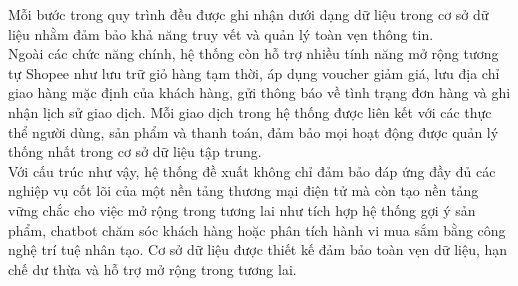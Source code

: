  Mỗi bước trong quy trình đều được ghi nhận dưới dạng dữ liệu trong cơ sở dữ liệu nhằm đảm bảo khả năng truy vết và 
 quản lý toàn vẹn thông tin. \\
 \hspace*{2em} Ngoài các chức năng chính, hệ thống còn hỗ trợ nhiều tính năng mở rộng tương tự Shopee như lưu trữ giỏ hàng tạm thời, 
 áp dụng voucher giảm giá, lưu địa chỉ giao hàng mặc định của khách hàng, gửi thông báo về tình trạng đơn hàng và 
 ghi nhận lịch sử giao dịch. Mỗi giao dịch trong hệ thống được liên kết với các thực thể người dùng, 
 sản phẩm và thanh toán, đảm bảo mọi hoạt động được quản lý thống nhất trong cơ sở dữ liệu tập trung.\\
\hspace*{2em}Với cấu trúc như vậy, hệ thống đề xuất không chỉ đảm bảo đáp ứng đầy đủ các nghiệp vụ cốt lõi của một nền tảng 
thương mại điện tử mà còn tạo nền tảng vững chắc cho việc mở rộng trong tương lai như 
tích hợp hệ thống gợi ý sản phẩm, chatbot chăm sóc khách hàng hoặc phân tích hành vi mua sắm bằng công nghệ trí tuệ nhân tạo. Cơ sở dữ liệu được thiết kế đảm bảo toàn vẹn dữ liệu, hạn chế dư thừa và hỗ trợ mở rộng trong tương lai.
